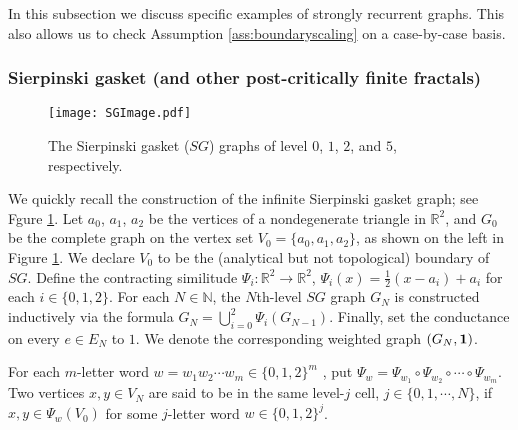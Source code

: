 \documentclass[11pt]{amsart}
\theoremstyle{plain}
\theoremstyle{definition}
\theoremstyle{remark}
\begin{document}
In this subsection we discuss specific examples of strongly recurrent graphs.
This also allows us to check Assumption \ref{ass:boundaryscaling} on a case-by-case basis. 

\subsubsection{Sierpinski gasket (and other post-critically finite fractals)}

\begin{figure}
\centering
\texttt{[image: SGImage.pdf]}
\caption{The Sierpinski gasket ($SG$) graphs of level $0$, $1$, $2$, and $5$, respectively.}
\label{fig:SGImage}
\end{figure}


We quickly recall the construction of the infinite Sierpinski gasket graph; see Fgure \ref{fig:SGImage}. Let $a_0$, $a_1$, $a_2$ be the vertices of a nondegenerate triangle in $\mathbb{R}^2$, and $G_0$ be the complete graph on the vertex set $V_0 = \{a_0, a_1, a_2\}$, as shown on the left in Figure \ref{fig:SGImage}. We declare $V_0$ to be the (analytical but not topological) boundary of $SG$. Define the contracting similitude $\Psi_i : \mathbb{R}^2 \to\mathbb{R}^2$, $\Psi_i(x) = \frac{1}{2}(x-a_i) + a_i $ for each $i\in \{0,1,2\}$. For each $N\in \mathbb{N}$, the $N$th-level $SG$ graph $G_N$ is constructed inductively via the formula $G_N = \bigcup_{i=0}^2 \Psi_i(G_{N-1})$. Finally, set the conductance on every $e\in E_N$ to $1$. We denote the corresponding weighted graph $(G_N, {\bf 1})$.

For each $m$-letter word $w=w_1 w_2 \cdots w_m \in \{0,1,2\}^m$ , put $\Psi_w = \Psi_{w_1} \circ \Psi_{w_2} \circ \cdots \circ \Psi_{w_m}$. Two vertices $x, y\in V_N$ are said to be in the same level-$j$ cell, $j\in \{0,1,\cdots, N\}$, if $x, y\in \Psi_w(V_0)$ for some $j$-letter word $w \in \{0,1,2\}^j$.

\end{document}
